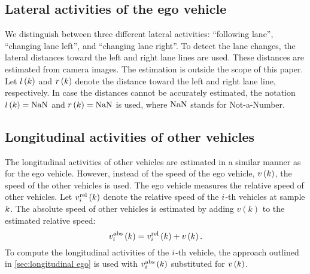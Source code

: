 \subsection{Lateral activities of the ego vehicle}
\label{sec:lateral ego}

We distinguish between three different lateral activities: ``following lane'', ``changing lane left'', and ``changing lane right''. To detect the lane changes, the lateral distances toward the left and right lane lines are used. These distances are estimated from camera images. The estimation is outside the scope of this paper.  Let $l\left(k\right)$ and $r\left(k\right)$ denote the distance toward the left and right lane line, respectively. In case the distances cannot be accurately estimated, the notation $l\left(k\right)=\mathrm{NaN}$ and $r\left(k\right)=\mathrm{NaN}$ is used, where $\mathrm{NaN}$ stands for Not-a-Number.





\subsection{Longitudinal activities of other vehicles}
\label{sec:longitudinal other vehicles}

The longitudinal activities of other vehicles are estimated in a similar manner as for the ego vehicle. However, instead of the speed of the ego vehicle, $v\left(k\right)$, the speed of the other vehicles is used. The ego vehicle measures the relative speed of other vehicles. Let $v_{i}^{\mathrm{rel}}\left(k\right)$ denote the relative speed of the $i$-th vehicles at sample $k$. The absolute speed of other vehicles is estimated by adding $v(k)$ to the estimated relative speed:
\begin{equation}
	v_{i}^{\mathrm{abs}}\left(k\right) = v_{i}^{\mathrm{rel}}\left(k\right) + v\left(k\right).
\end{equation}
To compute the longitudinal activities of the $i$-th vehicle, the approach outlined in \cref{sec:longitudinal ego} is used with $v_{i}^{\mathrm{abs}}\left(k\right)$ substituted for $v\left(k\right)$. 



